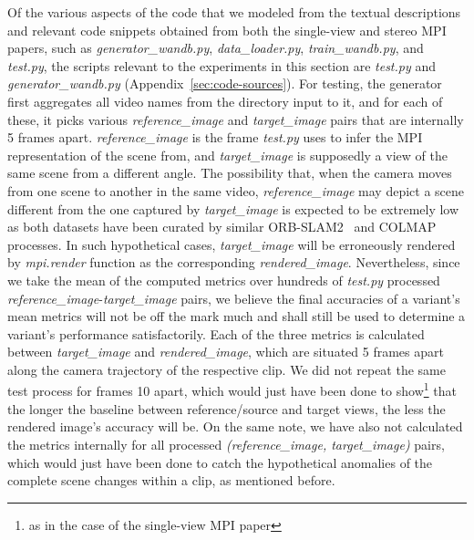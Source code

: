 Of the various aspects of the code that we modeled from the textual descriptions and relevant code snippets obtained from both the single-view and stereo MPI papers, such as \textit{generator\_wandb.py}, \textit{data\_loader.py}, \textit{train\_wandb.py}, and \textit{test.py}, the scripts relevant to the experiments in this section are \textit{test.py} and \textit{generator\_wandb.py} (Appendix~\ref{sec:code-sources}). For testing, the generator first aggregates all video names from the directory input to it, and for each of these, it picks various \textit{reference\_image} and \textit{target\_image} pairs that are internally 5 frames apart. \textit{reference\_image} is the frame \textit{test.py} uses to infer the MPI representation of the scene from, and \textit{target\_image} is supposedly a view of the same scene from a different angle. The possibility that, when the camera moves from one scene to another in the same video, \textit{reference\_image} may depict a scene different from the one captured by \textit{target\_image} is expected to be extremely low as both datasets have been curated by similar ORB-SLAM2~\cite{mur-artal_orb-slam_2015} and COLMAP~\cite{schoenberger2016sfm,schoenberger2016mvs} processes. In such hypothetical cases, \textit{target\_image} will be erroneously rendered by \textit{mpi.render} function as the corresponding \textit{rendered\_image}. Nevertheless, since we take the mean of the computed metrics over hundreds of \textit{test.py} processed \textit{reference\_image}-\textit{target\_image} pairs, we believe the final accuracies of a variant's mean metrics will not be off the mark much and shall still be used to determine a variant’s performance satisfactorily. Each of the three metrics is calculated between \textit{target\_image} and \textit{rendered\_image}, which are situated 5 frames apart along the camera trajectory of the respective clip. We did not repeat the same test process for frames 10 apart, which would just have been done to show\footnote{as in the case of the single-view MPI paper} that the longer the baseline between reference/source and target views, the less the rendered image’s accuracy will be. On the same note, we have also not calculated the metrics internally for all processed \textit{(reference\_image, target\_image)} pairs, which would just have been done to catch the hypothetical anomalies of the complete scene changes within a clip, as mentioned before. 

